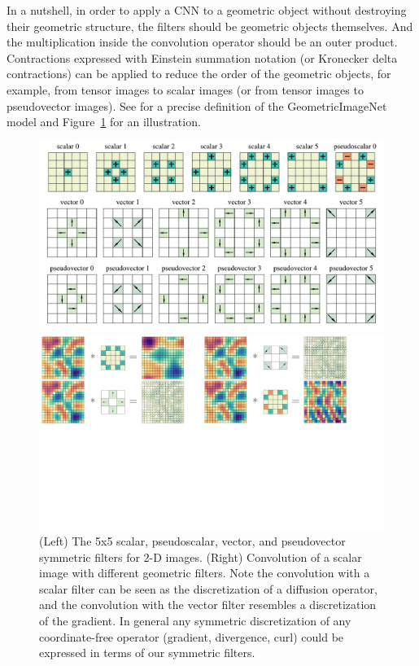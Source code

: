 \documentclass[11pt]{article}
\begin{document}
In a nutshell, in order to apply a CNN to a geometric object without destroying their geometric structure, the filters should be geometric objects themselves. And the multiplication inside the convolution operator should be an outer product. Contractions expressed with Einstein summation notation (or Kronecker delta contractions) can be applied to reduce the order of the geometric objects, for example, from tensor images to scalar images (or from tensor images to pseudovector images). See \cite{gregory2023geometricimagenet} for a precise definition of the GeometricImageNet model and Figure~\ref{fig.GINet} for an illustration. 
\begin{figure}
    \centering
    \begin{minipage}{0.37\textwidth}
    \includegraphics[width=\textwidth]{filters_m5.pdf}
    \end{minipage}
    \begin{minipage}{0.62\textwidth}
    \includegraphics[width=\textwidth]{convs.pdf}
    \end{minipage}
    \vspace{-.3cm}
    \caption{(Left) The 5x5 scalar, pseudoscalar, vector, and pseudovector symmetric filters for 2-D images. (Right) Convolution of a scalar image with different geometric filters. Note the convolution with a scalar filter can be seen as the discretization of a diffusion operator, and the convolution with the vector filter resembles a discretization of the gradient. In general any symmetric discretization of any coordinate-free operator (gradient, divergence, curl) could be expressed in terms of our symmetric filters.}
    \label{fig.GINet}
\end{figure}
\end{document}
